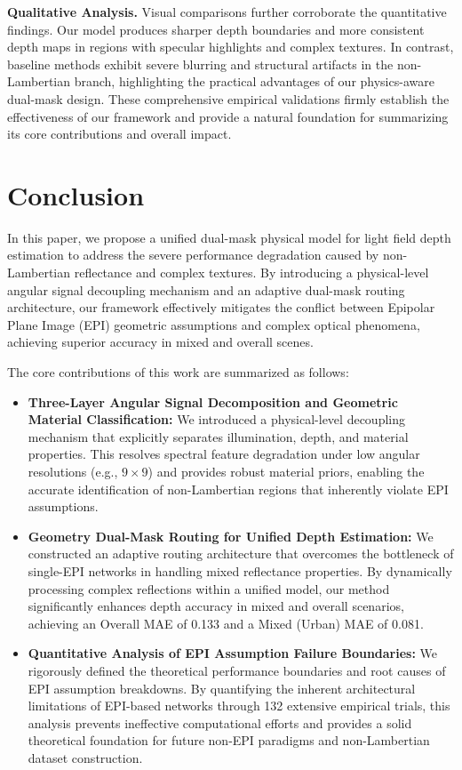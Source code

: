 \documentclass[lettersize,journal]{IEEEtran}
\begin{document}
\textbf{Qualitative Analysis.}
Visual comparisons further corroborate the quantitative findings. Our model produces sharper depth boundaries and more consistent depth maps in regions with specular highlights and complex textures. In contrast, baseline methods exhibit severe blurring and structural artifacts in the non-Lambertian branch, highlighting the practical advantages of our physics-aware dual-mask design. These comprehensive empirical validations firmly establish the effectiveness of our framework and provide a natural foundation for summarizing its core contributions and overall impact.

\section{Conclusion}

In this paper, we propose a unified dual-mask physical model for light field depth estimation to address the severe performance degradation caused by non-Lambertian reflectance and complex textures. By introducing a physical-level angular signal decoupling mechanism and an adaptive dual-mask routing architecture, our framework effectively mitigates the conflict between Epipolar Plane Image (EPI) geometric assumptions and complex optical phenomena, achieving superior accuracy in mixed and overall scenes.

The core contributions of this work are summarized as follows:
\begin{itemize}
    \item \textbf{Three-Layer Angular Signal Decomposition and Geometric Material Classification:} We introduced a physical-level decoupling mechanism that explicitly separates illumination, depth, and material properties. This resolves spectral feature degradation under low angular resolutions (e.g., $9 \times 9$) and provides robust material priors, enabling the accurate identification of non-Lambertian regions that inherently violate EPI assumptions.
    \item \textbf{Geometry Dual-Mask Routing for Unified Depth Estimation:} We constructed an adaptive routing architecture that overcomes the bottleneck of single-EPI networks in handling mixed reflectance properties. By dynamically processing complex reflections within a unified model, our method significantly enhances depth accuracy in mixed and overall scenarios, achieving an Overall MAE of 0.133 and a Mixed (Urban) MAE of 0.081.
    \item \textbf{Quantitative Analysis of EPI Assumption Failure Boundaries:} We rigorously defined the theoretical performance boundaries and root causes of EPI assumption breakdowns. By quantifying the inherent architectural limitations of EPI-based networks through 132 extensive empirical trials, this analysis prevents ineffective computational efforts and provides a solid theoretical foundation for future non-EPI paradigms and non-Lambertian dataset construction.
\end{itemize}
\end{document}
